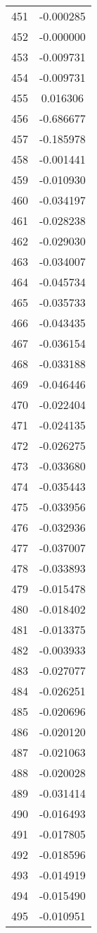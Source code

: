 \documentclass[12pt]{article}
\begin{document}
\begin{longtable}{@{}cc@{}}
451 & -0.000285 \\
452 & -0.000000 \\
453 & -0.009731 \\
454 & -0.009731 \\
455 & 0.016306 \\
456 & -0.686677 \\
457 & -0.185978 \\
458 & -0.001441 \\
459 & -0.010930 \\
460 & -0.034197 \\
461 & -0.028238 \\
462 & -0.029030 \\
463 & -0.034007 \\
464 & -0.045734 \\
465 & -0.035733 \\
466 & -0.043435 \\
467 & -0.036154 \\
468 & -0.033188 \\
469 & -0.046446 \\
470 & -0.022404 \\
471 & -0.024135 \\
472 & -0.026275 \\
473 & -0.033680 \\
474 & -0.035443 \\
475 & -0.033956 \\
476 & -0.032936 \\
477 & -0.037007 \\
478 & -0.033893 \\
479 & -0.015478 \\
480 & -0.018402 \\
481 & -0.013375 \\
482 & -0.003933 \\
483 & -0.027077 \\
484 & -0.026251 \\
485 & -0.020696 \\
486 & -0.020120 \\
487 & -0.021063 \\
488 & -0.020028 \\
489 & -0.031414 \\
490 & -0.016493 \\
491 & -0.017805 \\
492 & -0.018596 \\
493 & -0.014919 \\
494 & -0.015490 \\
495 & -0.010951 \\

\end{longtable}
\end{document}
